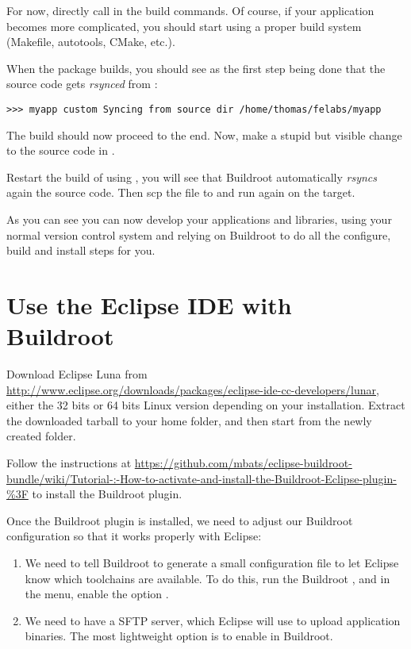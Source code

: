 For now, directly call  in the build commands. Of course, if
your application becomes more complicated, you should start using a
proper build system (Makefile, autotools, CMake, etc.).

When the package builds, you should see as the first step being done
that the  source code gets {\em rsynced} from
:

\begin{verbatim}
>>> myapp custom Syncing from source dir /home/thomas/felabs/myapp
\end{verbatim}

The build should now proceed to the end. Now, make a stupid but
visible change to the source code in .

Restart the build of  using , you
will see that Buildroot automatically {\em rsyncs} again the source
code. Then scp the file  to
 and run  again on the target.

As you can see you can now develop your applications and libraries,
using your normal version control system and relying on Buildroot to
do all the configure, build and install steps for you.

\section{Use the Eclipse IDE with Buildroot}

Download Eclipse Luna from
\url{http://www.eclipse.org/downloads/packages/eclipse-ide-cc-developers/lunar},
either the 32 bits or 64 bits Linux version depending on your
installation. Extract the downloaded tarball to your home folder, and
then start  from the newly created 
folder.

Follow the instructions at
\url{https://github.com/mbats/eclipse-buildroot-bundle/wiki/Tutorial-:-How-to-activate-and-install-the-Buildroot-Eclipse-plugin-%3F}
to install the Buildroot plugin.

Once the Buildroot plugin is installed, we need to adjust our Buildroot configuration so that it works properly with Eclipse:

\begin{enumerate}

\item We need to tell Buildroot to generate a small configuration file
  to let Eclipse know which toolchains are available. To do this, run
  the Buildroot , and in the  menu,
  enable the option .

\item We need to have a SFTP server, which Eclipse will use to upload
  application binaries. The most lightweight option is to enable
   in Buildroot.

\end{enumerate}

